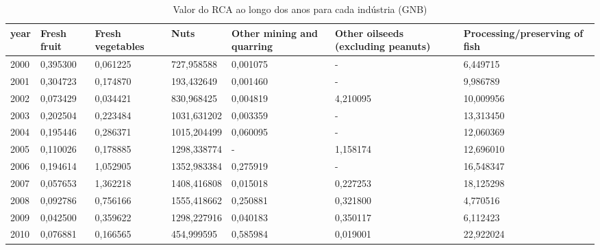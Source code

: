 \begin{table}
\centering
\caption{Valor do RCA ao longo dos anos para cada indústria (GNB)}
\begin{tabular}{p{1cm}p{2cm}p{2cm}p{2cm}p{2cm}p{2cm}p{2cm}}
\toprule
 year &  Fresh fruit &  Fresh vegetables &        Nuts &  Other mining and quarring &  Other oilseeds (excluding peanuts) &  Processing/preserving of fish \\
\midrule
 2000 &     0,395300 &          0,061225 &  727,958588 &                   0,001075 &                                   - &                       6,449715 \\
 2001 &     0,304723 &          0,174870 &  193,432649 &                   0,001460 &                                   - &                       9,986789 \\
 2002 &     0,073429 &          0,034421 &  830,968425 &                   0,004819 &                            4,210095 &                      10,009956 \\
 2003 &     0,202504 &          0,223484 & 1031,631202 &                   0,003359 &                                   - &                      13,313450 \\
 2004 &     0,195446 &          0,286371 & 1015,204499 &                   0,060095 &                                   - &                      12,060369 \\
 2005 &     0,110026 &          0,178885 & 1298,338774 &                          - &                            1,158174 &                      12,696010 \\
 2006 &     0,194614 &          1,052905 & 1352,983384 &                   0,275919 &                                   - &                      16,548347 \\
 2007 &     0,057653 &          1,362218 & 1408,416808 &                   0,015018 &                            0,227253 &                      18,125298 \\
 2008 &     0,092786 &          0,756166 & 1555,418662 &                   0,250881 &                            0,321800 &                       4,770516 \\
 2009 &     0,042500 &          0,359622 & 1298,227916 &                   0,040183 &                            0,350117 &                       6,112423 \\
 2010 &     0,076881 &          0,166565 &  454,999595 &                   0,585984 &                            0,019001 &                      22,922024 \\

\end{tabular}
\end{table}
